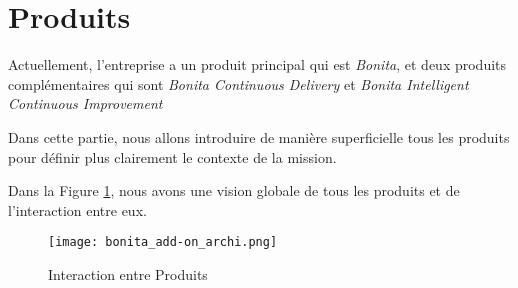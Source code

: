 \section{Produits} \label{produits}
Actuellement, l'entreprise a un produit principal qui est \emph{Bonita}, et deux produits complémentaires qui sont \textit{Bonita Continuous Delivery} et \textit{Bonita Intelligent Continuous Improvement}

Dans cette partie, nous allons introduire de manière superficielle tous les produits pour définir plus clairement le contexte de la mission.

Dans la Figure \ref{fig:bonita_add-on}, nous avons une vision globale de tous les produits et de l'interaction entre eux.

\begin{figure}[!ht]
\centering
\texttt{[image: bonita\_add-on\_archi.png]}
\caption{Interaction entre Produits}
\label{fig:bonita_add-on}
\end{figure}




